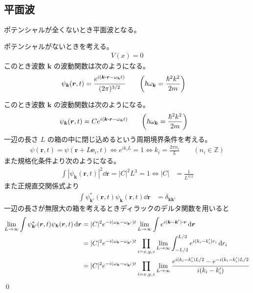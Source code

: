 \documentclass[uplatex,dvipdfmx,a4paper,11pt]{jlreq}
\makeatletter
\newcommand{\ZZ}{\mathbb{Z}}
\newcommand{\rr}{\bm{r}}
\newcommand{\kk}{\bm{k}}
\theoremstyle{definition}
\renewenvironment{proof}[1][\proofname]{\par
  \normalfont
  \topsep6\p@\@plus6\p@ \trivlist
  \item[\hskip\labelsep{\bfseries #1}\@addpunct{\bfseries}]\ignorespaces\quad\par
}{%
  \qed\endtrivlist\@endpefalse
}
\renewcommand\proofname{証明}
\makeatother
\begin{document}
\subsection{平面波}
ポテンシャルが全くないとき平面波となる。
\begin{proposition}
  ポテンシャルがないときを考える。
  \begin{align}
    V(x) = 0
  \end{align}
  このとき波数 $\kk$ の波動関数は次のようになる。
  \begin{align}
    \psi_{\kk}(\rr, t) & = \frac{e^{i(\kk\vdot\rr - \omega_{\kk}t)}}{(2\pi)^{3/2}} \qquad \qty(\hbar\omega_{\kk} = \frac{\hbar^2k^2}{2m})
  \end{align}
\end{proposition}
\begin{proof}
  このとき波数 $\kk$ の波動関数は次のようになる。
  \begin{align}
    \psi_{\kk}(\rr, t) & = Ce^{i(\kk\vdot\rr - \omega_{\kk}t)} \qquad \qty(\hbar\omega_{\kk} = \frac{\hbar^2k^2}{2m})
  \end{align}
  一辺の長さ $L$ の箱の中に閉じ込めるという周期境界条件を考える。
  \begin{align}
    \psi(\rr, t) = \psi(\rr + L\bm{e}_i, t) \iff e^{ik_iL} = 1 \iff k_i = \frac{2\pi n_i}{L} \qquad (n_i\in\ZZ)
  \end{align}
  また規格化条件より次のようになる。
  \begin{align}
    \int|\psi_{\kk}(\rr, t)|^2\dd{\rr} = |C|^2L^3 = 1 \iff |C| & = \frac{1}{L^{3/2}}
  \end{align}
  また正規直交関係式より
  \begin{align}
    \int\psi_{\kk'}^*(\rr, t)\psi_{\kk}(\rr, t)\dd{\rr} & = \delta_{\kk\kk'}
  \end{align}
  一辺の長さが無限大の箱を考えるときディラックのデルタ関数を用いると
  \begin{align}
    \lim_{L\to\infty}\int\psi_{\kk'}^*(\rr, t)\psi_{\kk}(\rr, t)\dd{\rr} & = |C|^2e^{-i(\omega_{\kk} - \omega_{\kk'})t}\lim_{L\to\infty}\int e^{i(\kk - \kk')\vdot\rr}\dd{\rr}                                            \\
                                                                         & = |C|^2e^{-i(\omega_{\kk} - \omega_{\kk'})t}\prod_{i=x,y,z}\lim_{L\to\infty}\int_{-L/2}^{L/2} e^{i(k_i - k_i')r_i}\dd{r_i}                     \\
                                                                         & = |C|^2e^{-i(\omega_{\kk} - \omega_{\kk'})t}\prod_{i=x,y,z}\lim_{L\to\infty}\frac{e^{i(k_i - k_i')L/2} - e^{-i(k_i - k_i')L/2}}{i(k_i - k_i')} \\

\end{align}
\end{proof}
\end{document}
